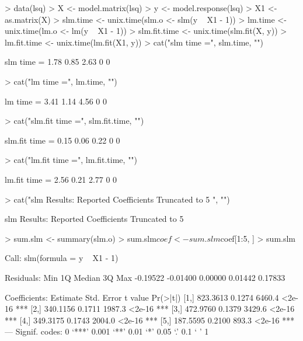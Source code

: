 \documentclass{article}
\begin{document}
\begin{Schunk}
\begin{Sinput}
> data(lsq)
> X <- model.matrix(lsq)
> y <- model.response(lsq)
> X1 <- as.matrix(X)
> slm.time <- unix.time(slm.o <- slm(y ~ X1 - 1))
> lm.time <- unix.time(lm.o <- lm(y ~ X1 - 1))
> slm.fit.time <- unix.time(slm.fit(X, y))
> lm.fit.time <- unix.time(lm.fit(X1, y))
> cat("slm time =", slm.time, "\n")
\end{Sinput}
\begin{Soutput}
slm time = 1.78 0.85 2.63 0 0 
\end{Soutput}
\begin{Sinput}
> cat("lm time =", lm.time, "\n")
\end{Sinput}
\begin{Soutput}
lm time = 3.41 1.14 4.56 0 0 
\end{Soutput}
\begin{Sinput}
> cat("slm.fit time =", slm.fit.time, "\n")
\end{Sinput}
\begin{Soutput}
slm.fit time = 0.15 0.06 0.22 0 0 
\end{Soutput}
\begin{Sinput}
> cat("lm.fit time =", lm.fit.time, "\n")
\end{Sinput}
\begin{Soutput}
lm.fit time = 2.56 0.21 2.77 0 0 
\end{Soutput}
\begin{Sinput}
> cat("slm Results: Reported Coefficients Truncated to 5  ", "\n")
\end{Sinput}
\begin{Soutput}
slm Results: Reported Coefficients Truncated to 5   
\end{Soutput}
\begin{Sinput}
> sum.slm <- summary(slm.o)
> sum.slm$coef <- sum.slm$coef[1:5, ]
> sum.slm
\end{Sinput}
\begin{Soutput}
Call:
slm(formula = y ~ X1 - 1)

Residuals:
     Min       1Q   Median       3Q      Max 
-0.19522 -0.01400  0.00000  0.01442  0.17833 

Coefficients:
     Estimate Std. Error t value Pr(>|t|)    
[1,] 823.3613     0.1274  6460.4   <2e-16 ***
[2,] 340.1156     0.1711  1987.3   <2e-16 ***
[3,] 472.9760     0.1379  3429.6   <2e-16 ***
[4,] 349.3175     0.1743  2004.0   <2e-16 ***
[5,] 187.5595     0.2100   893.3   <2e-16 ***
---
Signif. codes:  0 `***' 0.001 `**' 0.01 `*' 0.05 `.' 0.1 ` ' 1 


\end{Soutput}
\end{Schunk}
\end{document}
